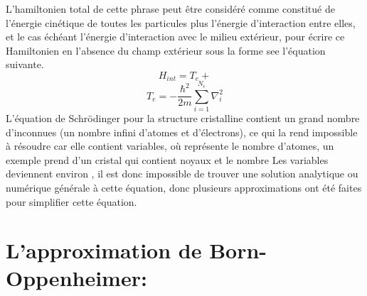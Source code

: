 L'hamiltonien total de cette phrase peut être considéré comme constitué de l'énergie cinétique de toutes les particules plus l'énergie d'interaction entre elles, et le cas échéant l'énergie d'interaction avec le milieu extérieur, pour écrire ce Hamiltonien en l'absence du champ extérieur sous la forme see l'équation suivante.
\begin{equation}\label{2-2}
	H_{int} = T_{e}+
\end{equation}
\begin{equation}\label{key}
	T_{e}= -\dfrac{\hbar^{2}}{2m}\sum_{i=1}^{N_{e}}\nabla_{i}^{2}
\end{equation}
L'équation de Schrödinger pour la structure cristalline contient un grand nombre d'inconnues (un nombre infini d'atomes et d'électrons), ce qui la rend impossible à résoudre car elle contient  variables, où  représente le nombre d'atomes, un exemple prend  d'un cristal qui contient  noyaux et le nombre Les variables deviennent environ , il est donc impossible de trouver une solution analytique ou numérique générale à cette équation, donc plusieurs approximations ont été faites pour simplifier cette équation.
\section{L’approximation de Born-Oppenheimer:}